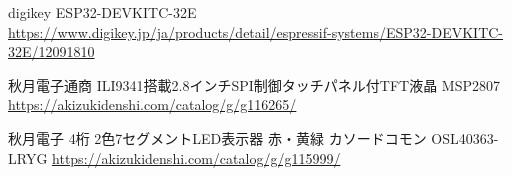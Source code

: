 \documentclass[uplatex,dvipdfmx]{jsarticle}
\begin{document}
\begin{thebibliography}{11}
digikey ESP32-DEVKITC-32E \url{https://www.digikey.jp/ja/products/detail/espressif-systems/ESP32-DEVKITC-32E/12091810}

秋月電子通商 ILI9341搭載2.8インチSPI制御タッチパネル付TFT液晶 MSP2807
\url{https://akizukidenshi.com/catalog/g/g116265/}


秋月電子 4桁 2色7セグメントLED表示器 赤・黄緑 カソードコモン OSL40363-LRYG
\url{https://akizukidenshi.com/catalog/g/g115999/}

\end{thebibliography}
\end{document}

